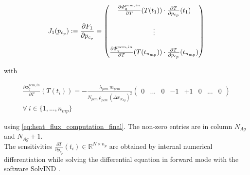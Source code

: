 \documentclass{scrartcl}[12pt, halfparskip]
\numberwithin{equation}{section}
\numberwithin{figure}{section}
\numberwithin{table}{section}
\begin{document}
\begin{equation}
	J_1(p_{c_p}) := \frac{\partial F_1}{\partial p_{c_p}} =
	\begin{pmatrix}
		\frac{\partial \varPhi_{q}^{pcm,in}}{\partial T}(T(t_1)) \cdot \frac{\partial T}{\partial p_{c_p}}(t_1) \\
		\textcolor{white}{} \\
		\vdots \\
		\textcolor{white}{} \\
		\frac{\partial \varPhi_{q}^{pcm,in}}{\partial T}(T(t_{n_{mp}})) \cdot \frac{\partial T}{\partial p_{c_p}}(t_{n_{mp}}) \\
	\end{pmatrix}
	\label{eq:optimization_jacobian}
\end{equation}

with

\begin{align}
	\frac{\partial \varPhi_{q}^{pcm,in}}{\partial T}(T(t_i)) = - \frac{\lambda_{pcm} \ m_{pcm}}{N_{pcm} \ \rho_{pcm} \ (\Delta x_{N_{Ag}})^2}
	\begin{pmatrix}
	0 & ... & 0 & -1 & +1 & 0 & ... & 0
	\end{pmatrix}\\
	\forall \ i \in \{1,...,n_{mp} \} \nonumber
\end{align}

using \cref{eq:heat_flux_computation_final}. The non-zero entries are in column $N_{Ag}$ and $N_{Ag}+1$. \\
The sensitivities $\frac{\partial T}{\partial p_{c_p}}(t_i) \in \mathbb{R}^{N \times n_p}$ are obtained by internal numerical differentiation while solving the differential equation in forward mode with the software SolvIND \cite{diss_jan}. 


\newpage
\end{document}
